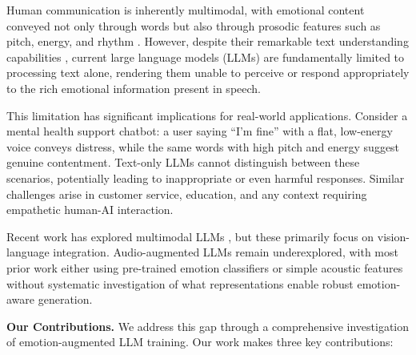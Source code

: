 Human communication is inherently multimodal, with emotional content conveyed not only through words but also through prosodic features such as pitch, energy, and rhythm \cite{scherer2003vocal}. However, despite their remarkable text understanding capabilities \cite{brown2020language, touvron2023llama}, current large language models (LLMs) are fundamentally limited to processing text alone, rendering them unable to perceive or respond appropriately to the rich emotional information present in speech.

This limitation has significant implications for real-world applications. Consider a mental health support chatbot: a user saying ``I'm fine'' with a flat, low-energy voice conveys distress, while the same words with high pitch and energy suggest genuine contentment. Text-only LLMs cannot distinguish between these scenarios, potentially leading to inappropriate or even harmful responses. Similar challenges arise in customer service, education, and any context requiring empathetic human-AI interaction.

Recent work has explored multimodal LLMs \cite{driess2023palm,alayrac2022flamingo}, but these primarily focus on vision-language integration. Audio-augmented LLMs remain underexplored, with most prior work either using pre-trained emotion classifiers \cite{shen2023hugginggpt} or simple acoustic features \cite{moritz2023speech} without systematic investigation of what representations enable robust emotion-aware generation.

\textbf{Our Contributions.} We address this gap through a comprehensive investigation of emotion-augmented LLM training. Our work makes three key contributions:

